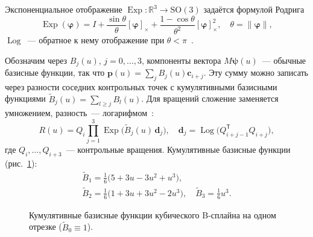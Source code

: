 \documentclass{misisarticle}
\newcommand{\Exp}{\operatorname{Exp}}
\newcommand{\Log}{\operatorname{Log}}
\newcommand{\cross}[1]{[#1]_{\times}}
\newcommand{\R}{\mathbb{R}}
\newcommand{\SO}{\mathrm{SO}(3)}
\newcommand{\T}{^{\mathsf{T}}}
\newcommand{\vb}[1]{\mathbf{#1}}
\begin{document}
Экспоненциальное отображение $\Exp:\R^3\to\SO$ задаётся формулой Родрига
\begin{equation*}
  \Exp(\boldsymbol\varphi)=I+\frac{\sin\theta}{\theta}\cross{\boldsymbol\varphi}+\frac{1-\cos\theta}{\theta^2}\cross{\boldsymbol\varphi}^2,\quad \theta=\|\boldsymbol\varphi\|,
\end{equation*}
$\Log$~--- обратное к нему отображение при $\theta<\pi$~\cite{sola}.

Обозначим через $B_j(u)$, $j=0,\dots,3$, компоненты вектора $M\boldsymbol\psi(u)$~--- обычные базисные функции, так что $\vb p(u)=\sum_j B_j(u)\vb c_{i+j}$. Эту сумму можно записать через разности соседних контрольных точек с кумулятивными базисными функциями $\tilde B_j(u)=\sum_{l\ge j}B_l(u)$. Для вращений сложение заменяется умножением, разность~--- логарифмом~\cite{kim, lovegrove}:
\begin{equation}
  R(u)=Q_i\prod_{j=1}^{3}\Exp\bigl(\tilde B_j(u)\,\vb d_j\bigr),\quad
  \vb d_j=\Log\bigl(Q_{i+j-1}\T Q_{i+j}\bigr),
  \label{eq:rot}
\end{equation}
где $Q_i,\dots,Q_{i+3}$~--- контрольные вращения. Кумулятивные базисные функции (рис.~\ref{fig:basis}):
\begin{equation}
  \begin{gathered}
    \tilde B_1=\tfrac16\bigl(5+3u-3u^2+u^3\bigr),\\
    \tilde B_2=\tfrac16\bigl(1+3u+3u^2-2u^3\bigr),\quad
    \tilde B_3=\tfrac16u^3.
  \end{gathered}
  \label{eq:cumbasis}
\end{equation}

\begin{figure}[htbp]
  \centering
  \caption{Кумулятивные базисные функции кубического B-сплайна на одном отрезке ($\tilde B_0\equiv 1$).}
  \label{fig:basis}
\end{figure}
\end{document}
